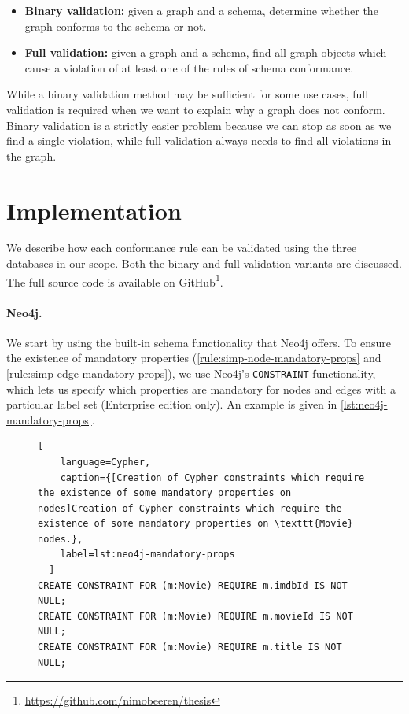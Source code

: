 \documentclass{report}
\theoremstyle{definition}
\begin{document}
\begin{itemize}
  \item \textbf{Binary validation:} given a graph and a schema, determine whether the graph conforms to the schema or not.
  \item \textbf{Full validation:} given a graph and a schema, find all graph objects which cause a violation of at least one of the rules of schema conformance.
\end{itemize}

While a binary validation method may be sufficient for some use cases, full validation is required when we want to explain why a graph does not conform. Binary validation is a strictly easier problem because we can stop as soon as we find a single violation, while full validation always needs to find all violations in the graph.

\section{Implementation}
\label{sec:implementation}

We describe how each conformance rule can be validated using the three databases in our scope. Both the binary and full validation variants are discussed. The full source code is available on GitHub\footnote{\url{https://github.com/nimobeeren/thesis}}.

\paragraph{Neo4j.} We start by using the built-in schema functionality that Neo4j offers. To ensure the existence of mandatory properties (\autoref{rule:simp-node-mandatory-props} and \ref{rule:simp-edge-mandatory-props}), we use Neo4j's \texttt{CONSTRAINT} functionality, which lets us specify which properties are mandatory for nodes and edges with a particular label set (Enterprise edition only). An example is given in \autoref{lst:neo4j-mandatory-props}.

\begin{figure}[H]
  \begin{lstlisting}[
    language=Cypher,
    caption={[Creation of Cypher constraints which require the existence of some mandatory properties on nodes]Creation of Cypher constraints which require the existence of some mandatory properties on \texttt{Movie} nodes.},
    label=lst:neo4j-mandatory-props
  ]
CREATE CONSTRAINT FOR (m:Movie) REQUIRE m.imdbId IS NOT NULL;
CREATE CONSTRAINT FOR (m:Movie) REQUIRE m.movieId IS NOT NULL;
CREATE CONSTRAINT FOR (m:Movie) REQUIRE m.title IS NOT NULL;
  \end{lstlisting}
\end{figure}
\end{document}
